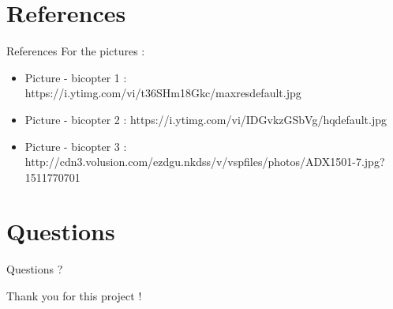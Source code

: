 \documentclass{beamer}
\begin{document}
\section{References}
\begin{frame}{References}
For the pictures :
\begin{itemize}
\item Picture - bicopter 1 : https://i.ytimg.com/vi/t36SHm18Gkc/maxresdefault.jpg
\item Picture - bicopter 2 : https://i.ytimg.com/vi/IDGvkzGSbVg/hqdefault.jpg
\item Picture - bicopter 3 : http://cdn3.volusion.com/ezdgu.nkdss/v/vspfiles/photos/ADX1501-7.jpg?1511770701
\end{itemize}
\end{frame}

\section{Questions}
\begin{frame}{}
\huge{Questions ?}
\end{frame}

\begin{frame}{}
\huge{Thank you for this project !}
\end{frame}
\end{document}
